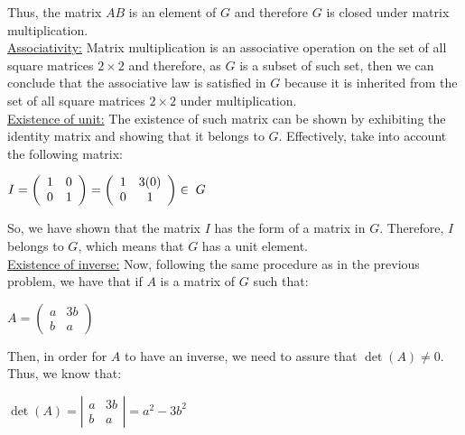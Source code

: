 \documentclass[a4paper,openany,11pt]{book}
\begin{document}
Thus, the matrix $AB$ is an element of $G$ and therefore $G$ is closed under matrix multiplication.\\

\underline{Associativity:} Matrix multiplication is an associative operation on the set of all square matrices $2\times2$ and therefore, as $G$ is a subset of such set, then we can conclude that the associative law is satisfied in $G$ because it is inherited from the set of all square matrices $2\times2$ under multiplication.\\

\underline{Existence of unit:} The existence of such matrix can be shown by exhibiting the identity matrix and showing that it belongs to $G$. Effectively, take into account the following matrix:

\begin{center}
	$I = \left(\begin{array}{cc}
		1 & 0\\
		0 & 1
	\end{array}\right) = \left(\begin{array}{cc}
	1 & 3(0)\\
	0 & 1
\end{array}\right) \in \hspace{0.1cm} G$
\end{center}

So, we have shown that the matrix $I$ has the form of a matrix in $G$. Therefore, $I$ belongs to $G$, which means that $G$ has a unit element.\\

\underline{Existence of inverse:} Now, following the same procedure as in the previous problem, we have that if $A$ is a matrix of $G$ such that:

\begin{center}
	$A = \left(\begin{array}{cc}
	a & 3b\\
	b & a
	\end{array}\right)$
\end{center}

Then, in order for $A$ to have an inverse, we need to assure that $\det(A) \neq 0$. Thus, we know that:

\begin{center}
	$\det(A) = \left|\begin{array}{cc}
	a & 3b\\
	b & a
	\end{array}\right| = a^{2} - 3b^{2}$
\end{center}
\end{document}
